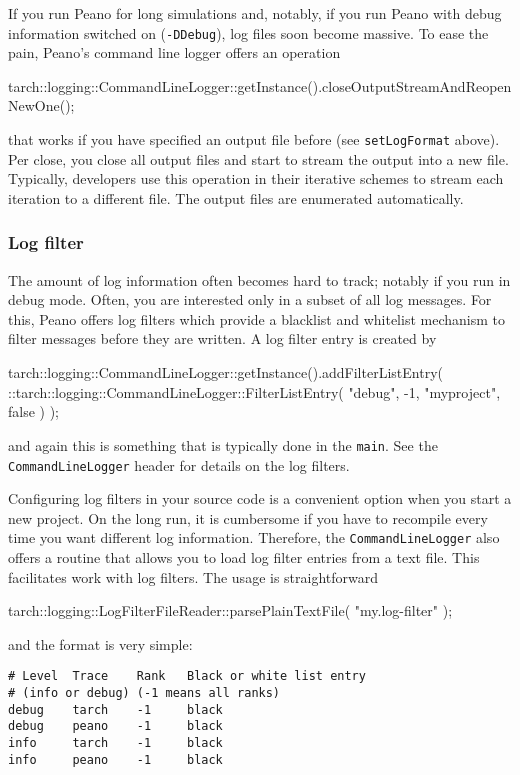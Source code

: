 If you run Peano for long simulations and, notably, if you run Peano with debug
information switched on (\texttt{-DDebug}), log files soon become massive.
To ease the pain, Peano's command line logger offers an operation 
\begin{code}
tarch::logging::CommandLineLogger::getInstance().closeOutputStreamAndReopenNewOne();
\end{code} 
\noindent
that works if you have specified an output file before (see
\texttt{setLogFormat} above). Per close, you close all output files and start to
stream the output into a new file.
Typically, developers use this operation in their iterative schemes to stream
each iteration to a different file.
The output files are enumerated automatically.



\subsubsection{Log filter}

The amount of log information often becomes hard to track; notably if you run in
debug mode.
Often, you are interested only in a subset of all log messages.
For this, Peano offers log filters which provide a blacklist and whitelist
mechanism to filter messages before they are written.
A log filter entry is created by 
\begin{code}
    tarch::logging::CommandLineLogger::getInstance().addFilterListEntry( 
      ::tarch::logging::CommandLineLogger::FilterListEntry( 
        "debug", -1, "myproject", false ) );
\end{code} 
\noindent
and again this is something that is typically done in the \texttt{main}.
See the \texttt{CommandLineLogger} header for details on the log filters.


Configuring log filters in your source code is a convenient option when you
start a new project.
On the long run, it is cumbersome if you have to recompile every time you want
different log information.
Therefore, the \texttt{CommandLineLogger} also offers a routine that allows you
to load log filter entries from a text file.
This facilitates work with log filters.
The usage is straightforward
\begin{code}
tarch::logging::LogFilterFileReader::parsePlainTextFile( "my.log-filter" );
\end{code}

\noindent
and the format is very simple:
\begin{verbatim}
# Level  Trace    Rank   Black or white list entry
# (info or debug) (-1 means all ranks)
debug    tarch    -1     black
debug    peano    -1     black
info     tarch    -1     black
info     peano    -1     black
\end{verbatim}




